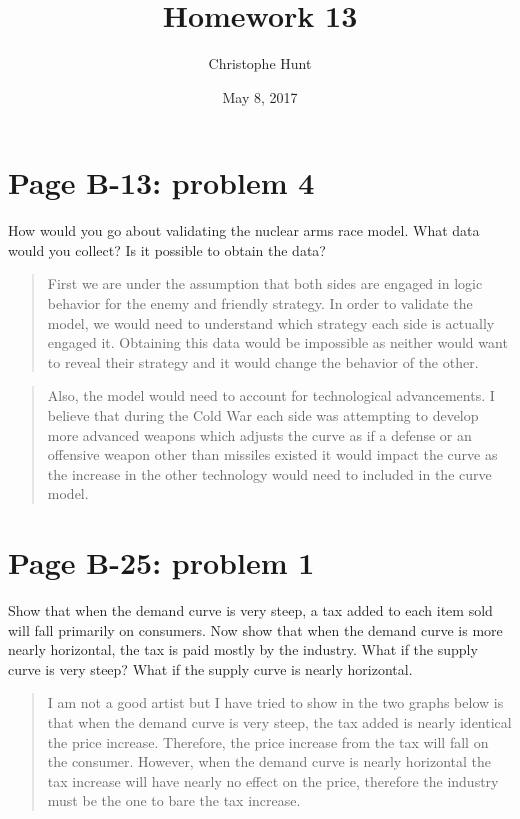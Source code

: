 \documentclass[]{article}
\title{Homework 13}
\author{Christophe Hunt}
\date{May 8, 2017}
\begin{document}
\maketitle

{
\setcounter{tocdepth}{2}
\tableofcontents
}
\newpage

\section{Page B-13: problem 4}\label{page-b-13-problem-4}

How would you go about validating the nuclear arms race model. What data
would you collect? Is it possible to obtain the data?

\begin{quote}
First we are under the assumption that both sides are engaged in logic
behavior for the enemy and friendly strategy. In order to validate the
model, we would need to understand which strategy each side is actually
engaged it. Obtaining this data would be impossible as neither would
want to reveal their strategy and it would change the behavior of the
other.
\end{quote}

\begin{quote}
Also, the model would need to account for technological advancements. I
believe that during the Cold War each side was attempting to develop
more advanced weapons which adjusts the curve as if a defense or an
offensive weapon other than missiles existed it would impact the curve
as the increase in the other technology would need to included in the
curve model.
\end{quote}

\newpage

\section{Page B-25: problem 1}\label{page-b-25-problem-1}

Show that when the demand curve is very steep, a tax added to each item
sold will fall primarily on consumers. Now show that when the demand
curve is more nearly horizontal, the tax is paid mostly by the industry.
What if the supply curve is very steep? What if the supply curve is
nearly horizontal.

\begin{quote}
I am not a good artist but I have tried to show in the two graphs below
is that when the demand curve is very steep, the tax added is nearly
identical the price increase. Therefore, the price increase from the tax
will fall on the consumer. However, when the demand curve is nearly
horizontal the tax increase will have nearly no effect on the price,
therefore the industry must be the one to bare the tax increase.
\end{quote}
\end{document}
